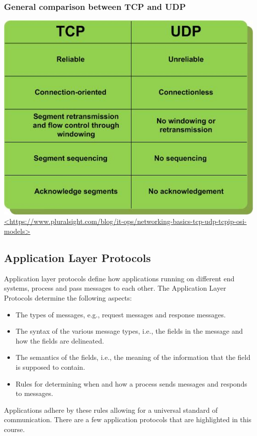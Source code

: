 \documentclass{article}
\begin{document}
\subsubsection{General comparison between TCP and UDP}
\begin{center}
\includegraphics[width=\textwidth]{TCPUDPComparison.jpg} \\
\url{<https://www.pluralsight.com/blog/it-ops/networking-basics-tcp-udp-tcpip-osi-models>}\\
\end{center}
\pagebreak

\subsection{Application Layer Protocols}
Application layer protocols define how applications running on different end systems, process and pass messages to each other. The Application Layer Protocols determine the following aspects:
\begin{itemize}
\item The types of messages, e.g., request messages and response messages.
\item The syntax of the various message types, i.e., the fields in the message and how the fields are delineated.
\item The semantics of the fields, i.e., the meaning of the information that the field is supposed to contain.
\item Rules for determining when and how a process sends messages and responds to messages.
\end{itemize}
Applications adhere by these rules allowing for a universal standard of communication. There are a few application protocols that are highlighted in this course.
\end{document}

